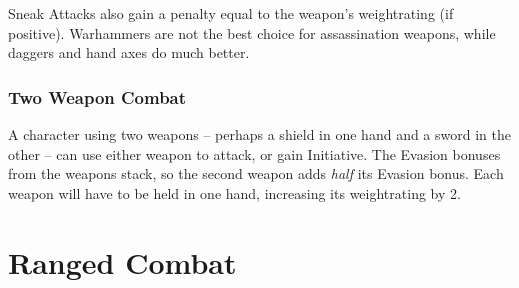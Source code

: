 \begin{multicols}{2}
Sneak Attacks also gain a penalty equal to the weapon's \gls{weightrating} (if positive).
Warhammers are not the best choice for assassination weapons, while daggers and hand axes do much better.

\subsubsection[Two Weapons: both weapons count as having +2 \glsentrytext{weightrating} when used in one hand, but either weapon can be used at any time, and the weapons Evasion Bonuses stack (the second counts for only half)]{Two Weapon Combat}

A character using two weapons -- perhaps a shield in one hand and a sword in the other -- can use either weapon to attack, or gain Initiative.
The Evasion bonuses from the weapons stack, so the second weapon adds \textit{half} its Evasion bonus.
Each weapon will have to be held in one hand, increasing its \gls{weightrating} by 2.

\end{multicols}

\stopcontents[Manoeuvres]

\section{Ranged Combat}

